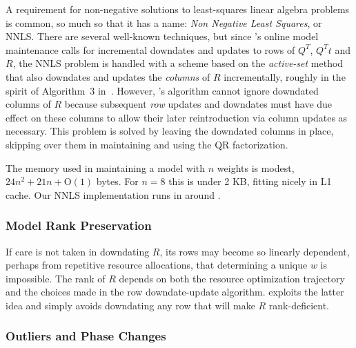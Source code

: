 A requirement for non-negative solutions to least-squares linear algebra problems is common,
so much so that it has a name: \emph{Non Negative Least Squares}, or NNLS.
There are several well-known techniques\cite{ChPl},
but since \pacora's online model maintenance calls for
incremental downdates and updates to rows of $Q^T$, $Q^Tt$ and $R$,
the NNLS problem is handled with a scheme
based on the \emph{active-set} method\cite{LaHa} that
also downdates and updates the \emph{columns} of $R$ incrementally,
roughly in the spirit of Algorithm~3 in~\cite{LuDu}.
However, \pacora's algorithm cannot ignore downdated columns of $R$
because subsequent \emph{row} updates and downdates must have due effect
on these columns to allow their later reintroduction via column updates as necessary.
This problem is solved by leaving the downdated columns in place,
skipping over them in maintaining and using the QR factorization.

The memory used in maintaining a model with $n$ weights is modest, $24n^2 + 21n + \textrm{O}(1)$ bytes.
For $n = 8$ this is under 2 KB, fitting nicely in L1 cache.
Our NNLS implementation runs in around .

\subsubsection{Model Rank Preservation}
If care is not taken in downdating $R$, its rows may become so linearly dependent,
perhaps from repetitive resource allocations,
that determining a unique $w$ is impossible.
The rank of $R$ depends on both the resource optimization trajectory and the
choices made in the row downdate-update algorithm.
\pacora exploits the latter idea and simply avoids downdating any row that will make $R$ rank-deficient.

\subsubsection{Outliers and Phase Changes}


